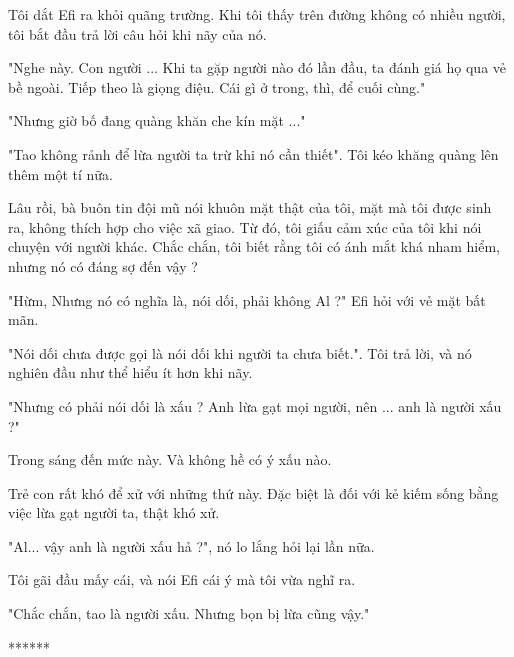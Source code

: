 Tôi dắt Efi ra khỏi quãng trường. Khi tôi thấy trên đường không có nhiều người, tôi bắt đầu trả lời câu hỏi khi nãy của nó. 

"Nghe này. Con người ... Khi ta gặp người nào đó lần đầu, ta đánh giá họ qua vẻ bề ngoài. Tiếp theo là giọng điệu. Cái gì ở trong, thì, để cuối cùng."

"Nhưng giờ bố đang quàng khăn che kín mặt ..."

"Tao không rảnh để lừa người ta trừ khi nó cần thiết". Tôi kéo khăng quàng lên thêm một tí nữa.

Lâu rồi, bà buôn tin đội mũ nói khuôn mặt thật của tôi, mặt mà tôi được sinh ra, không thích hợp cho việc xã giao. Từ đó, tôi giấu cảm xúc của tôi khi nói chuyện với người khác. Chắc chắn, tôi biết rằng tôi có ánh mắt khá nham hiểm, nhưng nó có đáng sợ đến vậy ?

"Hừm, Nhưng nó có nghĩa là, nói dối, phải không Al ?" Efi hỏi với vẻ mặt bất mãn.

"Nói dối chưa được gọi là nói dối khi người ta chưa biết.". Tôi trả lời, và nó nghiên đầu như thể hiểu ít hơn khi nãy.

"Nhưng có phải nói dối là xấu ? Anh lừa gạt mọi người, nên ... anh là người xấu ?"

Trong sáng đến mức này. Và không hề có ý xấu nào.

Trẻ con rất khó để xử với những thứ này. Đặc biệt là đối với kẻ kiếm sống bằng việc lừa gạt người ta, thật khó xử.

"Al... vậy anh là người xấu hả ?", nó lo lắng hỏi lại lần nữa.

Tôi gãi đầu mấy cái, và nói Efi cái ý mà tôi vừa nghĩ ra.

"Chắc chắn, tao là người xấu. Nhưng bọn bị lừa cũng vậy."

\begin{center}
	******
\end{center}















